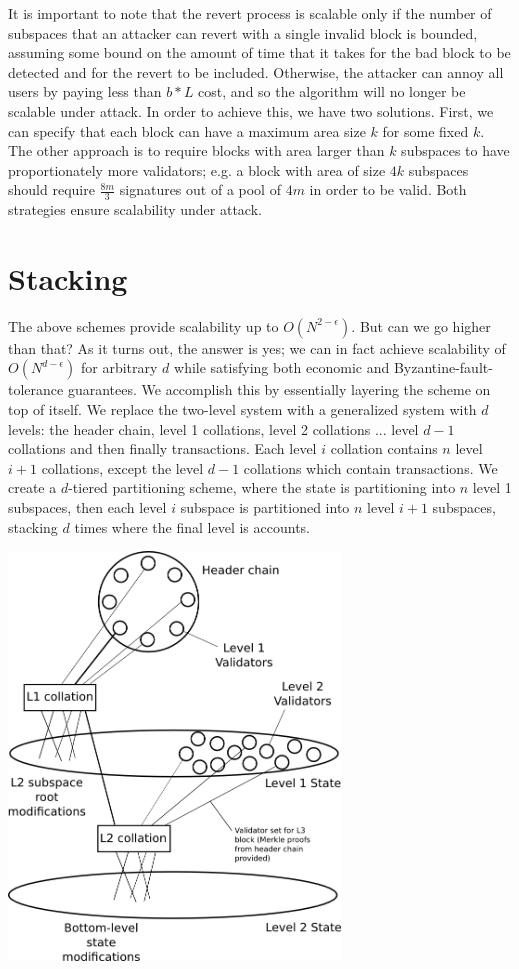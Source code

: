 \documentclass[11pt,a4paper]{article}
\makeatletter
\theoremstyle{plain}
\theoremstyle{definition}
\theoremstyle{remark}
\newcommand{\eg}{e.g.\@\xspace}
\makeatother
\begin{document}
It is important to note that the revert process is scalable only if the number of subspaces that an attacker can revert with a single invalid block is bounded, assuming some bound on the amount of time that it takes for the bad block to be detected and for the revert to be included. Otherwise, the attacker can annoy all users by paying less than $b * L$ cost, and so the algorithm will no longer be scalable under attack. In order to achieve this, we have two solutions. First, we can specify that each block can have a maximum area size $k$ for some fixed $k$. The other approach is to require blocks with area larger than $k$ subspaces to have proportionately more validators; \eg a block with area of size $4k$ subspaces should require $\frac{8m}{3}$ signatures out of a pool of $4m$ in order to be valid. Both strategies ensure scalability under attack.

\section{Stacking}

The above schemes provide scalability up to $O(N^{2-\epsilon})$. But can we go higher than that? As it turns out, the answer is yes; we can in fact achieve scalability of $O(N^{d-\epsilon})$ for arbitrary $d$ while satisfying both economic and Byzantine-fault-tolerance guarantees. We accomplish this by essentially layering the scheme on top of itself. We replace the two-level system with a generalized system with $d$ levels: the header chain, level 1 collations, level 2 collations ... level $d-1$ collations and then finally transactions. Each level $i$ collation contains $n$ level $i+1$ collations, except the level $d-1$ collations which contain transactions. We create a $d$-tiered partitioning scheme, where the state is partitioning into $n$ level 1 subspaces, then each level $i$ subspace is partitioned into $n$ level $i+1$ subspaces, stacking $d$ times where the final level is accounts.

\begin{center}
\includegraphics[width=250pt]{multilevel.png}
\end{center}
\end{document}
